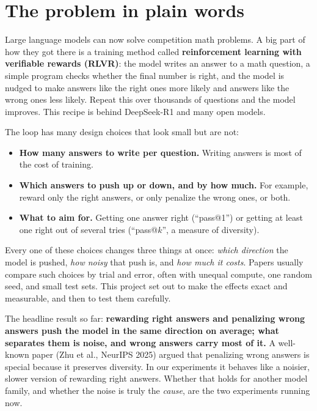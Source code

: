 \documentclass[11pt]{article}
\begin{document}
\section{The problem in plain words}

Large language models can now solve competition math problems. A big part of how they got there is a training method called \textbf{reinforcement learning with verifiable rewards (RLVR)}: the model writes an answer to a math question, a simple program checks whether the final number is right, and the model is nudged to make answers like the right ones more likely and answers like the wrong ones less likely. Repeat this over thousands of questions and the model improves. This recipe is behind DeepSeek-R1 and many open models.

The loop has many design choices that look small but are not:
\begin{itemize}[leftmargin=*,itemsep=1pt]
\item \textbf{How many answers to write per question.} Writing answers is most of the cost of training.
\item \textbf{Which answers to push up or down, and by how much.} For example, reward only the right answers, or only penalize the wrong ones, or both.
\item \textbf{What to aim for.} Getting one answer right (``pass@1'') or getting at least one right out of several tries (``pass@$k$'', a measure of diversity).
\end{itemize}
Every one of these choices changes three things at once: \emph{which direction} the model is pushed, \emph{how noisy} that push is, and \emph{how much it costs}. Papers usually compare such choices by trial and error, often with unequal compute, one random seed, and small test sets. This project set out to make the effects exact and measurable, and then to test them carefully.

The headline result so far: \textbf{rewarding right answers and penalizing wrong answers push the model in the same direction on average; what separates them is noise, and wrong answers carry most of it.} A well-known paper (Zhu et al., NeurIPS 2025) argued that penalizing wrong answers is special because it preserves diversity. In our experiments it behaves like a noisier, slower version of rewarding right answers. Whether that holds for another model family, and whether the noise is truly the \emph{cause}, are the two experiments running now.
\end{document}
